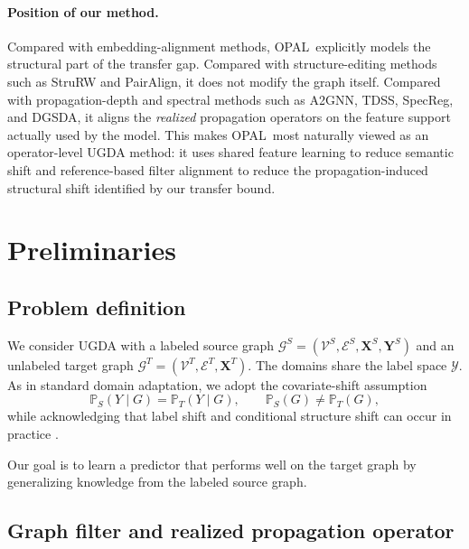 \documentclass[runningheads]{llncs}
\newcommand{\model}{OPAL}
\def\sG{{\mathcal{G}}}
\def\sV{{\mathcal{V}}}
\def\sE{{\mathcal{E}}}
\def\sY{{\mathcal{Y}}}
\def\dP{{\mathbb{P}}}
\def\mX{{\mathbf{X}}}
\def\mY{{\mathbf{Y}}}
\begin{document}
\paragraph{Position of our method.}
Compared with embedding-alignment methods, \model\ explicitly models the structural part of the transfer gap. Compared with structure-editing methods such as StruRW and PairAlign, it does not modify the graph itself. Compared with propagation-depth and spectral methods such as A2GNN, TDSS, SpecReg, and DGSDA, it aligns the \emph{realized} propagation operators on the feature support actually used by the model. This makes \model\ most naturally viewed as an operator-level UGDA method: it uses shared feature learning to reduce semantic shift and reference-based filter alignment to reduce the propagation-induced structural shift identified by our transfer bound.

\section{Preliminaries}

\subsection{Problem definition}

We consider UGDA with a labeled source graph $\sG^S=(\sV^S,\sE^S,\mX^S,\mY^S)$ and an unlabeled target graph $\sG^T=(\sV^T,\sE^T,\mX^T)$. The domains share the label space $\sY$. As in standard domain adaptation, we adopt the covariate-shift assumption
\[
\dP_S(Y\mid G)=\dP_T(Y\mid G), \qquad \dP_S(G)\neq \dP_T(G),
\]
while acknowledging that label shift and conditional structure shift can occur in practice \cite{ot_da,stru_rw,pair_align}.

Our goal is to learn a predictor that performs well on the target graph by generalizing knowledge from the labeled source graph.

\subsection{Graph filter and realized propagation operator}
\end{document}
